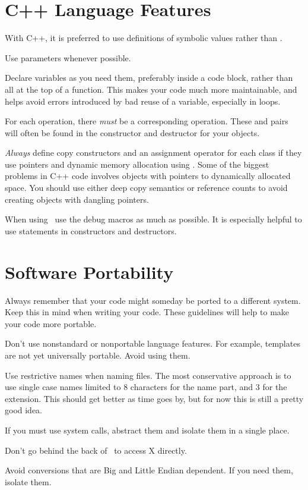 \section{C++ Language Features}

With C++, it is preferred to use  definitions
of symbolic values rather than .

Use  parameters whenever possible.

Declare variables as you need them, preferably inside
a code block, rather than all at the top of a function.
This makes your code much more maintainable, and helps
avoid errors introduced by bad reuse of a variable,
especially in loops.

For each  operation, there \emph{must} be a
corresponding  operation. These 
and  pairs will often be found in the
constructor and destructor for your objects.

\emph{Always} define copy constructors and an assignment operator
for each class if they use pointers and dynamic memory allocation
using . Some of the biggest problems in C++ code
involves objects with pointers to dynamically allocated
space. You should use either deep copy semantics or reference
counts to avoid creating objects with dangling pointers.

When using \V\, use the debug macros as much as possible.
It is especially helpful to use  statements
in constructors and destructors.

\section{Software Portability}

Always remember that your code might someday be ported to a
different system. Keep this in mind when writing your code.
These guidelines will help to make your code more portable.

Don't use nonstandard or nonportable language features. For
example, templates are not yet universally portable. Avoid
using them.

Use restrictive names when naming files. The most conservative
approach is to use single case names limited to 8 characters
for the name part, and 3 for the extension. This should
get better as time goes by, but for now this is still
a pretty good idea.

If you must use system calls, abstract them and isolate them
in a single place.

Don't go behind the back of \V\ to access X directly.

Avoid conversions that are Big and Little Endian dependent.
If you need them, isolate them.
